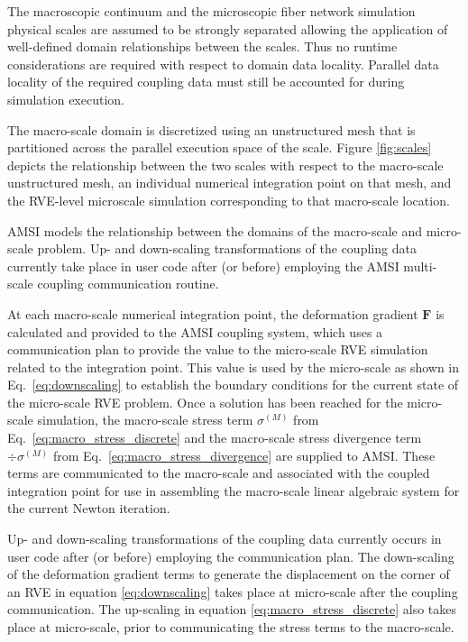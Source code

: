 \documentclass[]{interact}
\begin{document}
The macroscopic continuum and the microscopic fiber network simulation physical scales are assumed to be strongly separated allowing the application of well-defined domain relationships between the scales. Thus no runtime considerations are required with respect to domain data locality. Parallel data locality of the required coupling data must still be accounted for during simulation execution.

The macro-scale domain is discretized using an unstructured mesh that is partitioned across the parallel execution space of the scale. Figure \ref{fig:scales} depicts the relationship between the two scales with respect to the macro-scale unstructured mesh, an individual numerical integration point on that mesh, and the RVE-level microscale simulation corresponding to that macro-scale location.

AMSI models the relationship between the domains of the macro-scale and micro-scale problem. Up- and down-scaling transformations of the coupling data currently take place in user code after (or before) employing the AMSI multi-scale coupling communication routine.

At each macro-scale numerical integration point, the deformation gradient $\pmb{F}$ is calculated and provided to the AMSI coupling system, which uses a communication plan to provide the value to the micro-scale RVE simulation related to the integration point. This value is used by the micro-scale as shown in Eq.\ \eqref{eq:downscaling} to establish the boundary conditions for the current state of the micro-scale RVE problem. Once a solution has been reached for the micro-scale simulation, the macro-scale stress term $\sigma^{(M)}$ from Eq.\ \eqref{eq:macro_stress_discrete} and the macro-scale stress divergence term $\div \sigma^{(M)}$ from Eq.\ \eqref{eq:macro_stress_divergence} are supplied to AMSI. These terms are communicated to the macro-scale and associated with the coupled integration point for use in assembling the macro-scale linear algebraic system for the current Newton iteration.

Up- and down-scaling transformations of the coupling data currently occurs in user code after (or before) employing the communication plan. The down-scaling of the deformation gradient terms to generate the displacement on the corner of an RVE in equation \ref{eq:downscaling} takes place at micro-scale after the coupling communication. The up-scaling in equation \ref{eq:macro_stress_discrete} also takes place at micro-scale, prior to communicating the stress terms to the macro-scale.
\end{document}
